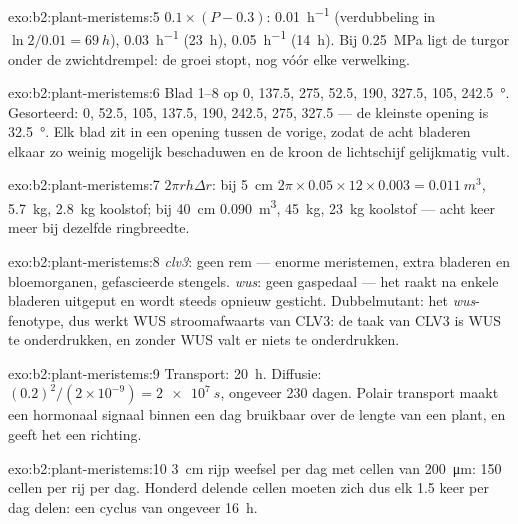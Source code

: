 \begin{solution}{exo:b2:plant-meristems:5}
$0.1\times(P - 0.3)$: \qty{0.01}{h^{-1}} (verdubbeling in $\ln 2/0.01 =
\qty{69}{h}$), \qty{0.03}{h^{-1}} (\qty{23}{h}), \qty{0.05}{h^{-1}}
(\qty{14}{h}). Bij \qty{0.25}{MPa} ligt de turgor onder de zwichtdrempel:
de groei stopt, nog vóór elke verwelking.
\end{solution}

\begin{solution}{exo:b2:plant-meristems:6}
Blad 1--8 op 0, 137.5, 275, 52.5, 190, 327.5, 105, \qty{242.5}{\degree}.
Gesorteerd: 0, 52.5, 105, 137.5, 190, 242.5, 275, 327.5 --- de kleinste
opening is \qty{32.5}{\degree}. Elk blad zit in een opening tussen de
vorige, zodat de acht bladeren elkaar zo weinig mogelijk beschaduwen en de
kroon de lichtschijf gelijkmatig vult.
\end{solution}

\begin{solution}{exo:b2:plant-meristems:7}
$2\pi r h\Delta r$: bij \qty{5}{cm} $2\pi\times 0.05\times 12\times
0.003 = \qty{0.011}{m^3}$, \qty{5.7}{kg}, \qty{2.8}{kg} koolstof; bij
\qty{40}{cm} \qty{0.090}{m^3}, \qty{45}{kg}, \qty{23}{kg} koolstof
--- acht keer meer bij dezelfde ringbreedte.
\end{solution}

\begin{solution}{exo:b2:plant-meristems:8}
\emph{clv3}: geen rem --- enorme meristemen, extra bladeren en bloemorganen,
gefascieerde stengels. \emph{wus}: geen gaspedaal --- het  raakt na
enkele bladeren uitgeput en wordt steeds opnieuw gesticht. Dubbelmutant: het
\emph{wus}-fenotype, dus werkt WUS stroomafwaarts van CLV3: de taak van CLV3
is WUS te onderdrukken, en zonder WUS valt er niets te onderdrukken.
\end{solution}

\begin{solution}{exo:b2:plant-meristems:9}
Transport: \qty{20}{h}. Diffusie: $(0.2)^{2}/(2\times 10^{-9}) =
\qty{2e7}{s}$, ongeveer 230 dagen. Polair transport maakt een hormonaal
signaal binnen een dag bruikbaar over de lengte van een plant, en geeft het
een richting.
\end{solution}

\begin{solution}{exo:b2:plant-meristems:10}
\qty{3}{cm} rijp weefsel per dag met cellen van \qty{200}{\micro m}:
\num{150} cellen per rij per dag. Honderd delende cellen moeten zich dus elk
1.5 keer per dag delen: een cyclus van ongeveer \qty{16}{h}.
\end{solution}

